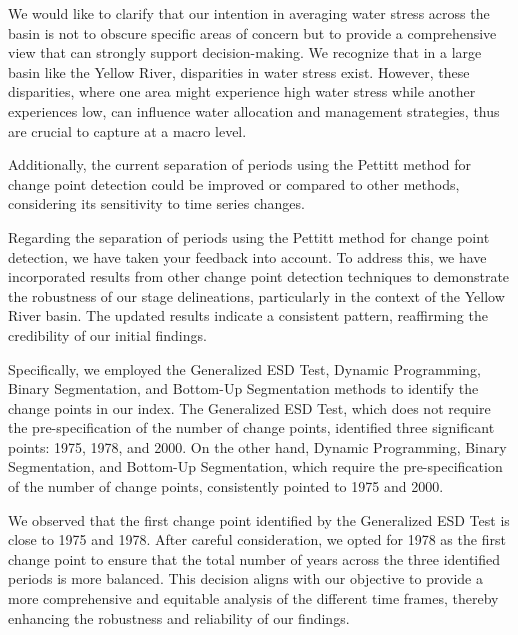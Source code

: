 \AR*{} We would like to clarify that our intention in averaging water stress across the basin is not to obscure specific areas of concern but to provide a comprehensive view that can strongly support decision-making. We recognize that in a large basin like the Yellow River, disparities in water stress exist. However, these disparities, where one area might experience high water stress while another experiences low, can influence water allocation and management strategies, thus are crucial to capture at a macro level.

\RC{} Additionally, the current separation of periods using the Pettitt method for change point detection could be improved or compared to other methods, considering its sensitivity to time series changes.

\AR{} Regarding the separation of periods using the Pettitt method for change point detection, we have taken your feedback into account. To address this, we have incorporated results from other change point detection techniques to demonstrate the robustness of our stage delineations, particularly in the context of the Yellow River basin. The updated results indicate a consistent pattern, reaffirming the credibility of our initial findings.

Specifically, we employed the Generalized ESD Test, Dynamic Programming, Binary Segmentation, and Bottom-Up Segmentation methods to identify the change points in our index. The Generalized ESD Test, which does not require the pre-specification of the number of change points, identified three significant points: 1975, 1978, and 2000. On the other hand, Dynamic Programming, Binary Segmentation, and Bottom-Up Segmentation, which require the pre-specification of the number of change points, consistently pointed to 1975 and 2000.

We observed that the first change point identified by the Generalized ESD Test is close to 1975 and 1978. After careful consideration, we opted for 1978 as the first change point to ensure that the total number of years across the three identified periods is more balanced. This decision aligns with our objective to provide a more comprehensive and equitable analysis of the different time frames, thereby enhancing the robustness and reliability of our findings.


